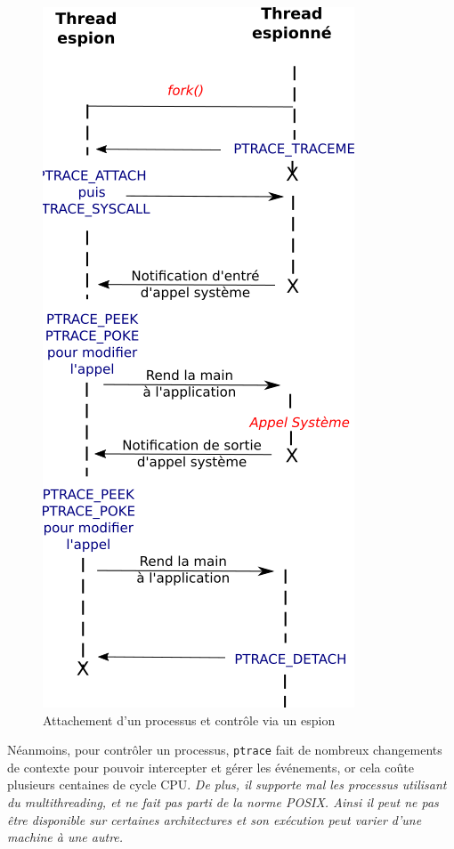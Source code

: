 \begin{figure}
   \centering
   \includegraphics[scale=0.5]{Pictures/png/ptrace_fonctionnement}
   \caption{Attachement d'un processus et contrôle via un espion}
   \label{PTRACE_FONCTIONNEMENT}
 \end{figure}
 
Néanmoins, pour contrôler un processus, \texttt{ptrace} fait de nombreux
changements de contexte pour pouvoir intercepter et gérer les événements, or
cela coûte plusieurs centaines de cycle CPU. \textit{De plus, il supporte mal
  les processus utilisant du multithreading, et ne fait pas parti de la norme
  POSIX. Ainsi il peut ne pas être disponible sur certaines architectures et son
  exécution peut varier d'une machine à une autre.}

